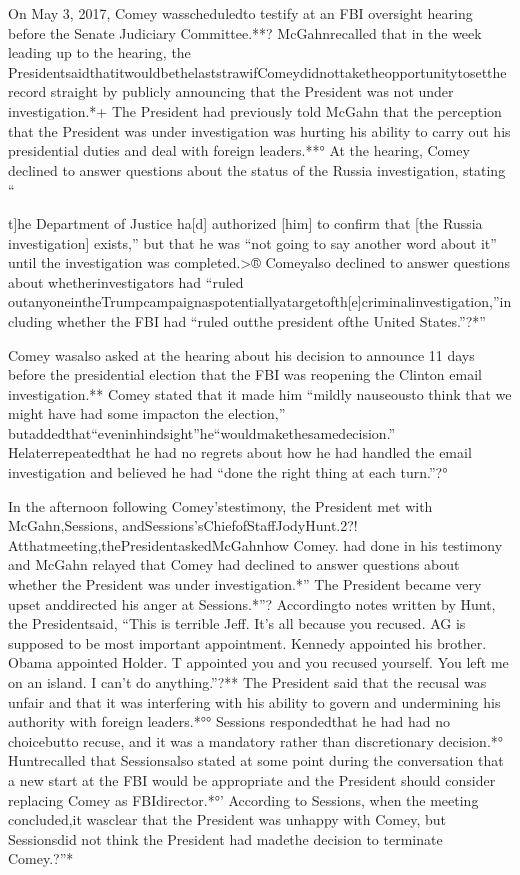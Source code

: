 On May 3, 2017, Comey wasscheduledto testify at an FBI oversight hearing before the Senate Judiciary Committee.**?
McGahnrecalled that in the week leading up to the hearing, the PresidentsaidthatitwouldbethelaststrawifComeydidnottaketheopportunitytosettherecord straight by publicly announcing that the President was not under investigation.*+
The President had previously told McGahn that the perception that the President was under investigation was hurting his ability to carry out his presidential duties and deal with foreign leaders.**°
At the hearing, Comey declined to answer questions about the status of the Russia investigation, stating “{t]he Department of Justice ha[d] authorized [him] to confirm that [the Russia investigation] exists,” but that he was “not going to say another word about it” until the investigation was completed.>®
Comeyalso declined to answer questions about whetherinvestigators had “ruled outanyoneintheTrumpcampaignaspotentiallyatargetofth[e]criminalinvestigation,”including whether the FBI had “ruled outthe president ofthe United States.”?*”

Comey wasalso asked at the hearing about his decision to announce 11 days before the presidential election that the FBI was reopening the Clinton email investigation.**
Comey stated that it made him “mildly nauseousto think that we might have had some impacton the election,” butaddedthat“eveninhindsight”he“wouldmakethesamedecision.”
Helaterrepeatedthat he had no regrets about how he had handled the email investigation and believed he had “done the right thing at each turn.”?°

In the afternoon following Comey’stestimony, the President met with McGahn,Sessions, andSessions’sChiefofStaffJodyHunt.2?!
Atthatmeeting,thePresidentaskedMcGahnhow Comey.
had done in his testimony and McGahn relayed that Comey had declined to answer questions about whether the President was under investigation.*”
The President became very upset anddirected his anger at Sessions.*”?
Accordingto notes written by Hunt, the Presidentsaid, “This is terrible Jeff.
It’s all because you recused.
AG is supposed to be most important appointment.
Kennedy appointed his brother.
Obama appointed Holder. T appointed you and you recused yourself.
You left me on an island.
I can’t do anything.”?**
The President said that the recusal was unfair and that it was interfering with his ability to govern and undermining his authority with foreign leaders.*°°
Sessions respondedthat he had had no choicebutto recuse, and it was a mandatory rather than discretionary decision.*°
Huntrecalled that Sessionsalso stated at some point during the conversation that a new start at the FBI would be appropriate and the President should consider replacing Comey as FBIdirector.*°’
According to Sessions, when the meeting concluded,it wasclear that the President was unhappy with Comey, but Sessionsdid not think the President had madethe decision to terminate Comey.?”*

}
